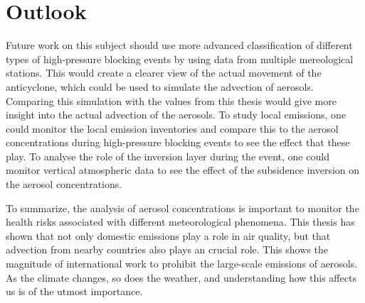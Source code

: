\section{Outlook}
Future work on this subject should use more advanced classification of different types of high-pressure blocking events by using data from multiple mereological stations. This would create a clearer view of the actual movement of the anticyclone, which could be used to simulate the advection of aerosols. Comparing this simulation with the values from this thesis would give more insight into the actual advection of the aerosols. To study local emissions, one could monitor the local emission inventories and compare this to the aerosol concentrations during high-pressure blocking events to see the effect that these play. To analyse the role of the inversion layer during the event, one could monitor vertical atmospheric data to see the effect of the subsidence inversion on the aerosol concentrations.

To summarize, the analysis of aerosol concentrations is important to monitor the health risks associated with different meteorological phenomena. This thesis has shown that not only domestic emissions play a role in air quality, but that advection from nearby countries also plays an crucial role. This shows the magnitude of international work to prohibit the large-scale emissions of aerosols. As the climate changes, so does the weather, and understanding how this affects us is of the utmost importance.


